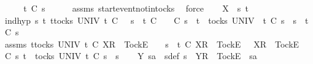 \begin{isabellebody}
\ \ \isamarkupfalse%
\ \isamarkupfalse%
\ {\isachardoublequoteopen}t\ {\isasymle}\isactrlsub C\ s{}{\isacharprime}{\isachardoublequoteclose}\isanewline
\ \ \ \ \isamarkupfalse%
\ assms{\isacharparenleft}{}{\isacharparenright}\ start{\isacharunderscore}event{\isacharunderscore}notin{\isacharunderscore}tocks\ \isamarkupfalse%
\ force\isanewline
{}\isamarkupfalse%
\isanewline
\ \ \isamarkupfalse%
\ X\ {\isasymsigma}\ s{}{\isacharprime}\ t\isanewline
\ \ \isamarkupfalse%
\ ind{\isacharunderscore}hyp{\isacharcolon}\ {\isachardoublequoteopen}{\isasymAnd}s{}{\isacharprime}\ t{\isachardot}\ {\isasymforall}t{\isasymin}tocks\ UNIV{\isachardot}\ t\ {\isasymle}\isactrlsub C\ {\isasymsigma}\ {\isacharat}\ s{}\ {\isasymlongrightarrow}\ t\ {\isasymle}\isactrlsub C\ {\isasymsigma}\ {\isasymLongrightarrow}\ {\isasymsigma}\ {\isasymsubseteq}\isactrlsub C\ s{}{\isacharprime}\ {\isasymLongrightarrow}\ t\ {\isasymin}\ tocks\ UNIV\ {\isasymLongrightarrow}\ t\ {\isasymle}\isactrlsub C\ s{}{\isacharprime}\ {\isacharat}\ s{}\ {\isasymLongrightarrow}\ t\ {\isasymle}\isactrlsub C\ s{}{\isacharprime}{\isachardoublequoteclose}\isanewline
\ \ \isamarkupfalse%
\ assms{\isacharcolon}\ {\isachardoublequoteopen}{\isasymforall}t{\isasymin}tocks\ UNIV{\isachardot}\ t\ {\isasymle}\isactrlsub C\ {\isacharparenleft}{\isacharbrackleft}X{\isacharbrackright}\isactrlsub R\ {\isacharhash}\ {\isacharbrackleft}Tock{\isacharbrackright}\isactrlsub E\ {\isacharhash}\ {\isasymsigma}{\isacharparenright}\ {\isacharat}\ s{}\ {\isasymlongrightarrow}\ t\ {\isasymle}\isactrlsub C\ {\isacharbrackleft}X{\isacharbrackright}\isactrlsub R\ {\isacharhash}\ {\isacharbrackleft}Tock{\isacharbrackright}\isactrlsub E\ {\isacharhash}\ {\isasymsigma}{\isachardoublequoteclose}\ {\isachardoublequoteopen}{\isacharbrackleft}X{\isacharbrackright}\isactrlsub R\ {\isacharhash}\ {\isacharbrackleft}Tock{\isacharbrackright}\isactrlsub E\ {\isacharhash}\ {\isasymsigma}\ {\isasymsubseteq}\isactrlsub C\ s{}{\isacharprime}{\isachardoublequoteclose}\ {\isachardoublequoteopen}t\ {\isasymin}\ tocks\ UNIV{\isachardoublequoteclose}\ {\isachardoublequoteopen}t\ {\isasymle}\isactrlsub C\ s{}{\isacharprime}\ {\isacharat}\ s{}{\isachardoublequoteclose}\isanewline
\ \ \isamarkupfalse%
\ Y\ s{}{\isacharprime}a\ \ s{}{\isacharprime}{\isacharunderscore}def{\isacharcolon}\ {\isachardoublequoteopen}s{}{\isacharprime}\ {\isacharequal}\ {\isacharbrackleft}Y{\isacharbrackright}\isactrlsub R\ {\isacharhash}\ {\isacharbrackleft}Tock{\isacharbrackright}\isactrlsub E\ {\isacharhash}\ s{}{\isacharprime}a{\isachardoublequoteclose}\isanewline

\end{isabellebody}
